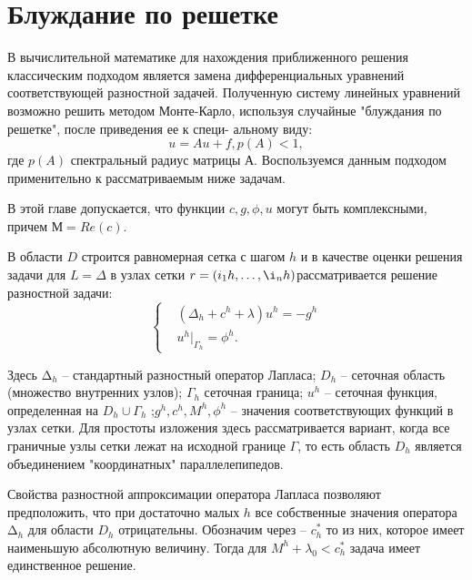 \section{Блуждание по решетке}
\label{Bl}
В вычислительной математике для нахождения приближенного решения классическим подходом является замена дифференциальных уравнений соответствующей разностной задачей. Полученную систему линейных уравнений возможно решить методом Монте-Карло, используя случайные "блуждания по решетке", после приведения ее к специ-
альному виду:
\begin{equation}
	u = Au + f, p(A) < 1,
\end{equation}
где $p(A)$  спектральный радиус матрицы А. Воспользуемся данным подходом применительно к рассматриваемым ниже задачам.

В этой главе допускается, что функции $c, g, \phi, u$ могут быть комплексными, причем $М = Re(c)$.

В области $D$ строится равномерная сетка с шагом $h$ и в качестве
оценки решения задачи для $L = \Delta $ в узлах сетки $r=(i_{1}h,\dots,\i_{n}h) $рассматривается решение разностной задачи:
\begin{equation} 
	\left\{
\begin{aligned}
& (\Delta_{h}+c^{h}+\lambda)u^{h}=-g^{h}\\ & u^{h}|_{\Gamma_{h}}=\phi^{h}.
\end{aligned}
 \right. 
 \label{qw1}
 \end{equation}
 
Здесь $∆_{h} $ -- стандартный разностный оператор Лапласа; $D_{h}$ -- сеточная область (множество внутренних узлов); $Γ_{h}$  сеточная граница; $u^{h}$ --  сеточная функция, определенная на $D_{h} \cup \Gamma_{h}$ ;$g^{h},c^{h},M^{h},\phi^{h}$ -- значения соответствующих функций в узлах сетки. Для простоты изложения здесь
рассматривается вариант, когда все граничные узлы сетки лежат на исходной границе $Γ$, то есть область $D_{h}$ является объединением "координатных" параллелепипедов.

Свойства разностной аппроксимации оператора Лапласа позволяют
предположить, что при достаточно малых $h$ все собственные значения
оператора $∆_{h}$ для области $D_{h}$ отрицательны. Обозначим через -- $c^{*}_{h}$ то из них, которое имеет наименьшую абсолютную величину. Тогда для $ M^{h}+\lambda_{0} < c^{*}_{h} $
задача имеет единственное решение.

